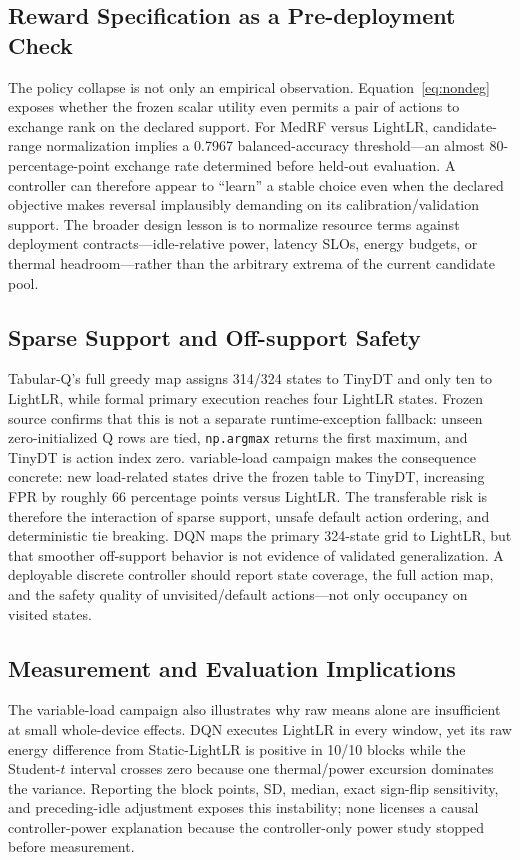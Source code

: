 \subsection{Reward Specification as a Pre-deployment Check}
The policy collapse is not only an empirical observation. Equation~\eqref{eq:nondeg} exposes whether the frozen scalar utility even permits a pair of actions to exchange rank on the declared support. For MedRF versus LightLR, candidate-range normalization implies a 0.7967 balanced-accuracy threshold---an almost 80-percentage-point exchange rate determined before held-out evaluation. A controller can therefore appear to ``learn'' a stable choice even when the declared objective makes reversal implausibly demanding on its calibration/validation support. The broader design lesson is to normalize resource terms against deployment contracts---idle-relative power, latency SLOs, energy budgets, or thermal headroom---rather than the arbitrary extrema of the current candidate pool.

\subsection{Sparse Support and Off-support Safety}
Tabular-Q's full greedy map assigns 314/324 states to TinyDT and only ten to LightLR, while formal primary execution reaches four LightLR states. Frozen source confirms that this is not a separate runtime-exception fallback: unseen zero-initialized Q rows are tied, \texttt{np.argmax} returns the first maximum, and TinyDT is action index zero. variable-load campaign makes the consequence concrete: new load-related states drive the frozen table to TinyDT, increasing FPR by roughly 66 percentage points versus LightLR. The transferable risk is therefore the interaction of sparse support, unsafe default action ordering, and deterministic tie breaking. DQN maps the primary 324-state grid to LightLR, but that smoother off-support behavior is not evidence of validated generalization. A deployable discrete controller should report state coverage, the full action map, and the safety quality of unvisited/default actions---not only occupancy on visited states.

\subsection{Measurement and Evaluation Implications}
The variable-load campaign also illustrates why raw means alone are insufficient at small whole-device effects. DQN executes LightLR in every window, yet its raw energy difference from Static-LightLR is positive in 10/10 blocks while the Student-$t$ interval crosses zero because one thermal/power excursion dominates the variance. Reporting the block points, SD, median, exact sign-flip sensitivity, and preceding-idle adjustment exposes this instability; none licenses a causal controller-power explanation because the controller-only power study stopped before measurement.

